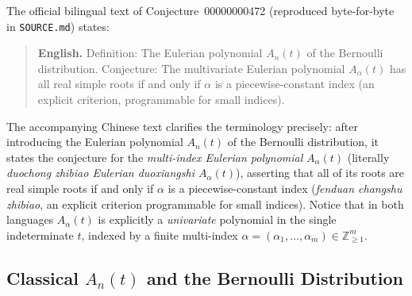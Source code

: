 \documentclass[11pt]{article}
\theoremstyle{definition}
\newcommand{\ZZ}{\mathbb{Z}}
\begin{document}
The official bilingual text of Conjecture~00000000472 (reproduced byte-for-byte in
\texttt{SOURCE.md}) states:

\begin{quote}
\textbf{English.} Definition: The Eulerian polynomial $A_n(t)$ of the Bernoulli
distribution. Conjecture: The multivariate Eulerian polynomial $A_\alpha(t)$ has all real
simple roots if and only if $\alpha$ is a piecewise-constant index (an explicit criterion,
programmable for small indices).
\end{quote}

The accompanying Chinese text clarifies the terminology precisely: after introducing the
Eulerian polynomial $A_n(t)$ of the Bernoulli distribution, it states the conjecture for
the \emph{multi-index Eulerian polynomial} $A_\alpha(t)$ (literally \emph{duochong zhibiao
Eulerian duoxiangshi $A_\alpha(t)$}), asserting that all of its roots are real simple roots
if and only if $\alpha$ is a piecewise-constant index (\emph{fenduan changshu zhibiao}, an
explicit criterion programmable for small indices). Notice that in both languages
$A_\alpha(t)$ is explicitly a \emph{univariate} polynomial in the single indeterminate $t$,
indexed by a finite multi-index $\alpha = (\alpha_1, \dots, \alpha_m) \in \ZZ_{\ge 1}^m$.

\subsection{Classical \texorpdfstring{$A_n(t)$}{A\_n(t)} and the Bernoulli Distribution}
\end{document}
